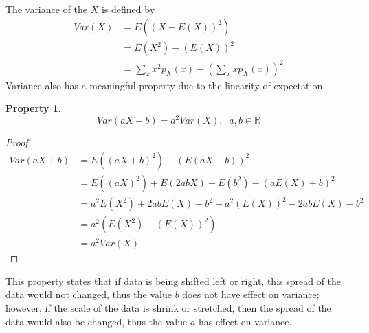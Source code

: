 \documentclass{article}
\newtheorem{property}{Property}
\begin{document}
The variance of the $X$ is defined by
\begin{align*}
 Var(X) &= E\left((X-E(X))^2 \right)\\ 
 &= E(X^2) - (E(X))^2\\ 
 &= \sum_x x^2p_X(x) - \left(\sum_x xp_X(x) \right)^2
\end{align*}
\[ \]
Variance also has a meaningful property due to the linearity of expectation.
\begin{property}
	\[ Var(aX+b) = a^2Var(X),\;\;a,b\in\mathbb{R} \]
\end{property}
\begin{proof}
	\begin{align*}
	Var(aX+b) &=  E((aX+b)^2) - (E(aX+b))^2\\
	&= E((aX)^2) + E(2abX) + E(b^2) - (aE(X)+b)^2\\
	&= a^2E(X^2) + 2abE(X) + b^2 - a^2(E(X))^2 - 2abE(X) -b^2\\
	&= a^2(E(X^2) - (E(X))^2)\\
	&= a^2Var(X)
	\end{align*}	
\end{proof}
This property states that if data is being shifted left or right, this spread of the data would not changed, thus the value $b$ does not have effect on variance; however, if the scale of the data is shrink or stretched, then the spread of the data would also be changed, thus the value $a$ has effect on variance. 
\end{document}
